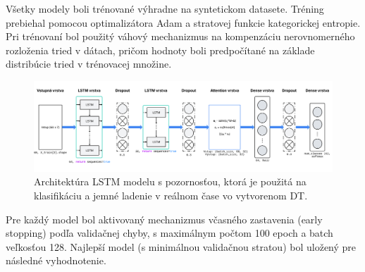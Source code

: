 \documentclass[a4paper,10pt]{ieeetran}
\begin{document}

Všetky modely boli trénované výhradne na syntetickom datasete. Tréning prebiehal pomocou optimalizátora Adam a stratovej funkcie kategorickej entropie. Pri trénovaní bol použitý váhový mechanizmus na kompenzáciu nerovnomerného rozloženia tried v dátach, pričom hodnoty boli predpočítané na základe distribúcie tried v trénovacej množine.

\begin{figure}[]
    \centering
    \includegraphics[width=1\linewidth]{model_architecture.png}
    \caption{Architektúra LSTM modelu s pozornosťou, ktorá je použitá na klasifikáciu a jemné ladenie v reálnom čase vo vytvorenom DT.}
    \label{fig:model_attention}
\end{figure}

Pre každý model bol aktivovaný mechanizmus včasného zastavenia (early stopping) podľa validačnej chyby, s maximálnym počtom 100 epoch a batch veľkosťou 128. Najlepší model (s minimálnou validačnou stratou) bol uložený pre následné vyhodnotenie.
\end{document}
